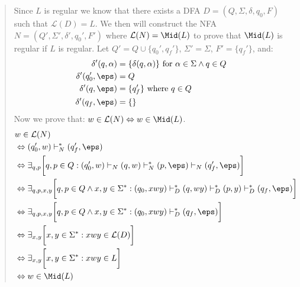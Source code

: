 \begin{quote}
    Since $L$ is regular we know that there exists a DFA $D = (Q, \Sigma, \delta, q_0, F)$ such that $\mathcal{L}(D)=L$. We then will construct the NFA $N = (Q', \Sigma', \delta', q_0', F')$ where $\mathcal{L}(N) = \Mid(L)$ to prove that $\Mid(L)$ is regular if $L$ is regular.
    \bigskip
    Let $Q' = Q \cup \{ q_0', q_f' \}$, $\Sigma' = \Sigma$, $F' = \{ q_f' \}$, and:
    \begin{align}
           \delta'(q, \alpha) &= \{ \delta(q, \alpha) \} \text{ for } \alpha\in\Sigma \wedge q \in Q
        \\ \delta'(q_0', \eps) &= Q 
        \\ \delta'(q, \eps) &= \{ q_f' \} \text{ where }q \in Q
        \\ \delta'(q_f, \eps) &= \{ \}
    \end{align}
    Now we prove that: $w\in\mathcal{L}(N) \Leftrightarrow w\in\Mid(L)$.
    \begin{align}
        &w\in\mathcal{L}(N)
        \\&\Leftrightarrow (q_0', w)\vdash^*_N(q_f', \eps)
        \\&\Leftrightarrow \exists_{q, p}\bigg[ 
            q, p \in Q :
            (q_0', w) \vdash_N (q, w) \vdash_N^* (p, \eps) \vdash_N (q_f', \eps) 
        \bigg]
        \\&\Leftrightarrow \exists_{q, p, x, y}\bigg[ 
            q, p \in Q \wedge x, y \in \Sigma^* :
            (q_0, xwy) \vdash_D^* (q, wy) \vdash_D^* (p, y) \vdash_D^* (q_f, \eps) 
        \bigg]
        \\&\Leftrightarrow \exists_{q, p, x, y}\bigg[ 
            q, p \in Q \wedge x, y \in \Sigma^* :
            (q_0, xwy) \vdash_D^* (q_f, \eps) 
        \bigg]
        \\&\Leftrightarrow \exists_{x, y}\bigg[ 
            x, y \in \Sigma^* : 
            xwy \in \mathcal{L}(D)
        \bigg]
        \\&\Leftrightarrow \exists_{x, y}\bigg[ 
            x, y \in \Sigma^* : 
            xwy \in L
        \bigg]
        \\&\Leftrightarrow w\in\Mid(L)    
    \end{align}
\end{quote}